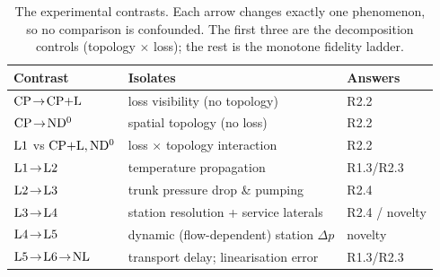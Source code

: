 \begin{table}[t]
\centering
\caption{The experimental contrasts. Each arrow changes exactly one phenomenon, so no
comparison is confounded. The first three are the decomposition controls (topology
$\times$ loss); the rest is the monotone fidelity ladder.}
\label{tab:contrasts}
\begin{tabular}{lll}
\hline
Contrast & Isolates & Answers \\
\hline
$\mathrm{CP}\!\to\!\mathrm{CP{+}L}$ & loss visibility (no topology) & R2.2 \\
$\mathrm{CP}\!\to\!\mathrm{ND^{0}}$ & spatial topology (no loss) & R2.2 \\
$\mathrm{L1}$ vs $\mathrm{CP{+}L},\mathrm{ND^{0}}$ & loss $\times$ topology interaction & R2.2 \\
$\mathrm{L1}\!\to\!\mathrm{L2}$ & temperature propagation & R1.3/R2.3 \\
$\mathrm{L2}\!\to\!\mathrm{L3}$ & trunk pressure drop \& pumping & R2.4 \\
$\mathrm{L3}\!\to\!\mathrm{L4}$ & station resolution + service laterals & R2.4 / novelty \\
$\mathrm{L4}\!\to\!\mathrm{L5}$ & dynamic (flow-dependent) station $\Delta p$ & novelty \\
$\mathrm{L5}\!\to\!\mathrm{L6}\!\to\!\mathrm{NL}$ & transport delay; linearisation error & R1.3/R2.3 \\
\hline
\end{tabular}
\end{table}
